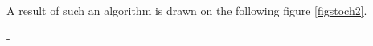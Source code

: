 {  A result of such an algorithm is drawn on the following figure \ref{figstoch2}.
  \begin{center}
  \end{center}
}
{
  -
}

